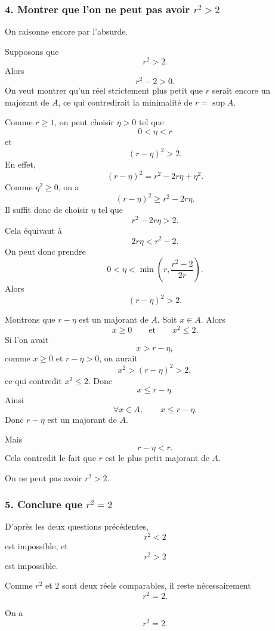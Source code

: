 \documentclass[11pt,a4paper]{article}
\begin{document}

\subsubsection*{4. Montrer que l'on ne peut pas avoir \(r^2>2\)}

On raisonne encore par l'absurde.

Supposons que
\[
r^2>2.
\]
Alors
\[
r^2-2>0.
\]
On veut montrer qu'un réel strictement plus petit que \(r\) serait encore un majorant de \(A\), ce qui contredirait la minimalité de \(r=\sup A\).

Comme \(r\geq 1\), on peut choisir \(\eta>0\) tel que
\[
0<\eta<r
\]
et
\[
(r-\eta)^2>2.
\]
En effet,
\[
(r-\eta)^2=r^2-2r\eta+\eta^2.
\]
Comme \(\eta^2\geq 0\), on a
\[
(r-\eta)^2\geq r^2-2r\eta.
\]
Il suffit donc de choisir \(\eta\) tel que
\[
r^2-2r\eta>2.
\]
Cela équivaut à
\[
2r\eta<r^2-2.
\]
On peut donc prendre
\[
0<\eta<\min\left(r,\frac{r^2-2}{2r}\right).
\]
Alors
\[
(r-\eta)^2>2.
\]

Montrons que \(r-\eta\) est un majorant de \(A\). Soit \(x\in A\). Alors
\[
x\geq 0
\qquad\text{et}\qquad
x^2\leq 2.
\]
Si l'on avait
\[
x>r-\eta,
\]
comme \(x\geq 0\) et \(r-\eta>0\), on aurait
\[
x^2>(r-\eta)^2>2,
\]
ce qui contredit \(x^2\leq 2\). Donc
\[
x\leq r-\eta.
\]
Ainsi
\[
\forall x\in A,\qquad x\leq r-\eta.
\]
Donc \(r-\eta\) est un majorant de \(A\).

Mais
\[
r-\eta<r.
\]
Cela contredit le fait que \(r\) est le plus petit majorant de \(A\).

\begin{resultatbox}
On ne peut pas avoir \(r^2>2\).
\end{resultatbox}


\subsubsection*{5. Conclure que \(r^2=2\)}

D'après les deux questions précédentes,
\[
r^2<2
\]
est impossible, et
\[
r^2>2
\]
est impossible.

Comme \(r^2\) et \(2\) sont deux réels comparables, il reste nécessairement
\[
r^2=2.
\]

\begin{resultatbox}
On a
\[
r^2=2.
\]
\end{resultatbox}
\end{document}
